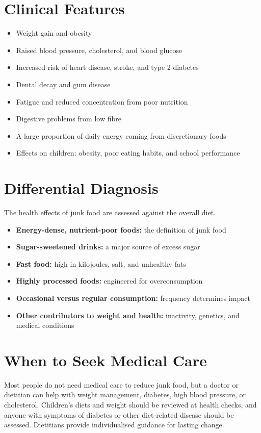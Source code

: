 \section*{Clinical Features}
\begin{itemize}
    \item Weight gain and obesity
    \item Raised blood pressure, cholesterol, and blood glucose
    \item Increased risk of heart disease, stroke, and type 2 diabetes
    \item Dental decay and gum disease
    \item Fatigue and reduced concentration from poor nutrition
    \item Digestive problems from low fibre
    \item A large proportion of daily energy coming from discretionary foods
    \item Effects on children: obesity, poor eating habits, and school performance
\end{itemize}

\section*{Differential Diagnosis}
The health effects of junk food are assessed against the overall diet.
\begin{itemize}
    \item \textbf{Energy-dense, nutrient-poor foods:} the definition of junk food
    \item \textbf{Sugar-sweetened drinks:} a major source of excess sugar
    \item \textbf{Fast food:} high in kilojoules, salt, and unhealthy fats
    \item \textbf{Highly processed foods:} engineered for overconsumption
    \item \textbf{Occasional versus regular consumption:} frequency determines impact
    \item \textbf{Other contributors to weight and health:} inactivity, genetics, and medical conditions
\end{itemize}

\section*{When to Seek Medical Care}
Most people do not need medical care to reduce junk food, but a doctor or dietitian can help with weight management, diabetes, high blood pressure, or cholesterol. Children's diets and weight should be reviewed at health checks, and anyone with symptoms of diabetes or other diet-related disease should be assessed. Dietitians provide individualised guidance for lasting change.

